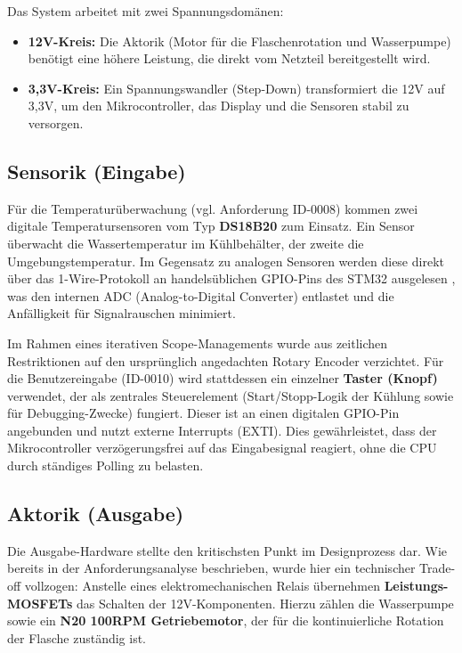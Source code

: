  Das System arbeitet mit zwei Spannungsdomänen:
 \begin{itemize}
 	\item \textbf{12V-Kreis:} Die Aktorik (Motor für die Flaschenrotation und Wasserpumpe) benötigt eine höhere Leistung, die direkt vom Netzteil bereitgestellt wird.
 	\item \textbf{3,3V-Kreis:} Ein Spannungswandler (Step-Down) transformiert die 12V auf 3,3V, um den Mikrocontroller, das Display und die Sensoren stabil zu versorgen.
 \end{itemize}
 
 \subsection{Sensorik (Eingabe)}
 Für die Temperaturüberwachung (vgl. Anforderung ID-0008) kommen zwei digitale Temperatursensoren vom Typ \textbf{DS18B20} zum Einsatz. Ein Sensor überwacht die Wassertemperatur im Kühlbehälter, der zweite die Umgebungstemperatur. Im Gegensatz zu analogen Sensoren werden diese direkt über das 1-Wire-Protokoll an handelsüblichen GPIO-Pins des STM32 ausgelesen \cite{ds18b20_datasheet}, was den internen ADC (Analog-to-Digital Converter) entlastet und die Anfälligkeit für Signalrauschen minimiert.
 
 Im Rahmen eines iterativen Scope-Managements wurde aus zeitlichen Restriktionen auf den ursprünglich angedachten Rotary Encoder verzichtet. Für die Benutzereingabe (ID-0010) wird stattdessen ein einzelner \textbf{Taster (Knopf)} verwendet, der als zentrales Steuerelement (Start/Stopp-Logik der Kühlung sowie für Debugging-Zwecke) fungiert. Dieser ist an einen digitalen GPIO-Pin angebunden und nutzt externe Interrupts (EXTI). Dies gewährleistet, dass der Mikrocontroller verzögerungsfrei auf das Eingabesignal reagiert, ohne die CPU durch ständiges Polling zu belasten.
 
 \subsection{Aktorik (Ausgabe)}
 Die Ausgabe-Hardware stellte den kritischsten Punkt im Designprozess dar. Wie bereits in der Anforderungsanalyse beschrieben, wurde hier ein technischer Trade-off vollzogen: Anstelle eines elektromechanischen Relais übernehmen \textbf{Leistungs-MOSFETs} das Schalten der 12V-Komponenten. Hierzu zählen die Wasserpumpe sowie ein \textbf{N20 100RPM Getriebemotor}, der für die kontinuierliche Rotation der Flasche zuständig ist.
 
